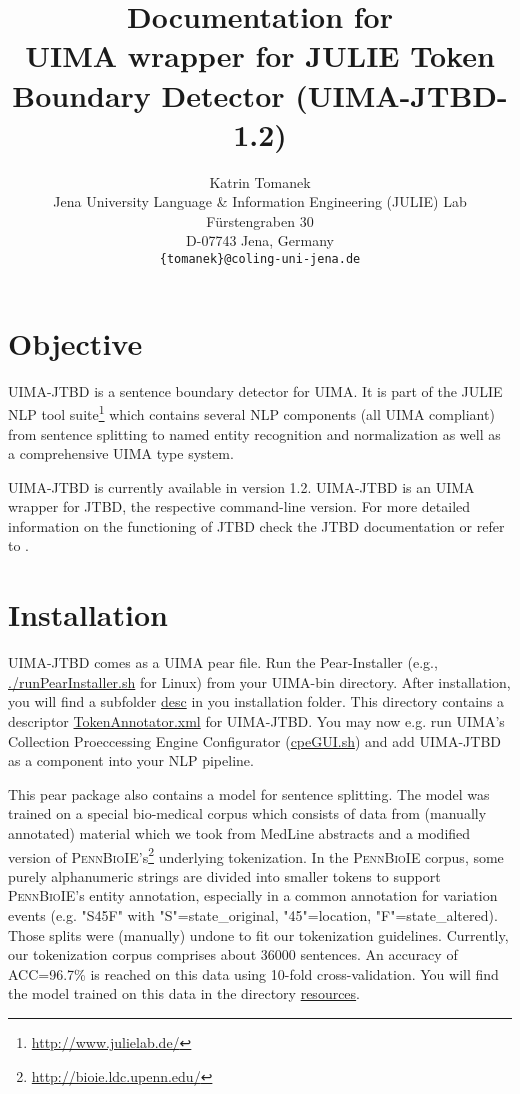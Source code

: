 \documentclass[11pt,a4paper,halfparskip]{scrartcl}
\title{\small{Documentation for}\\\huge UIMA wrapper for JULIE Token Boundary Detector
  (UIMA-JTBD-1.2)}
\author{\normalsize Katrin Tomanek\\
  \normalsize  Jena University Language \& Information Engineering (JULIE) Lab\\
  \normalsize F\"urstengraben 30 \\
  \normalsize D-07743 Jena, Germany\\
  {\normalsize \tt \{tomanek\}@coling-uni-jena.de} }
\date{}
\begin{document}
\maketitle

\section{Objective}

UIMA-JTBD is a sentence boundary detector for UIMA.  It is part of
the JULIE NLP tool suite\footnote{\url{http://www.julielab.de/}} which
contains several NLP components (all UIMA compliant) from sentence
splitting to named entity recognition and normalization as well as a
comprehensive UIMA type system.

UIMA-JTBD is currently available in version 1.2. UIMA-JTBD is an UIMA
wrapper for JTBD, the respective command-line version. For more
detailed information on the functioning of JTBD check the JTBD
documentation or refer to \cite{Tomanek2007a}.

\section{Installation}

UIMA-JTBD comes as a UIMA pear file. Run the Pear-Installer (e.g.,
\url{./runPearInstaller.sh} for Linux) from your UIMA-bin directory.
After installation, you will find a subfolder \url{desc} in you
installation folder. This directory contains a descriptor
\url{TokenAnnotator.xml} for UIMA-JTBD. You may now e.g. run UIMA's
Collection Proeccessing Engine Configurator (\url{cpeGUI.sh}) and add
UIMA-JTBD as a component into your NLP pipeline.

This pear package also contains a model for sentence splitting. The
model was trained on a special bio-medical corpus which consists of data from (manually
annotated) material which we took from MedLine abstracts and a
modified version of
\textsc{PennBioIE}'s\footnote{\url{http://bioie.ldc.upenn.edu/}}
underlying tokenization. In the \textsc{PennBioIE} corpus, some purely
alphanumeric strings are divided into smaller tokens to support
\textsc{PennBioIE}'s entity annotation, especially in a common
annotation for variation events (e.g.  "S45F" with "S"=state\_original,
"45"=location, "F"=state\_altered).  Those splits were (manually)
undone to fit our tokenization guidelines.
Currently, our tokenization corpus comprises about 36000 sentences.
An accuracy of ACC=96.7\% is reached on this data using 10-fold
cross-validation.  You will find the model trained on this data in the
directory \url{resources}.
\end{document}
